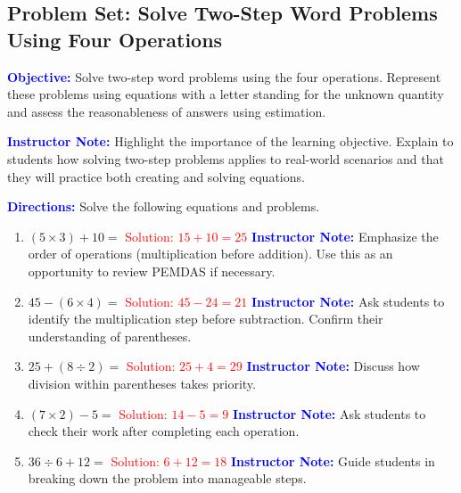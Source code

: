\documentclass[27.26.36148pt]{article}
\begin{document}
\subsection*{Problem Set: Solve Two-Step Word Problems Using Four Operations}
\onehalfspacing

\begin{tcolorbox}[colframe=black!40, colback=gray!5, 
coltitle=black, colbacktitle=black!20, fonttitle=\bfseries\Large, 
title=Learning Objective, halign title=center, left=5pt, right=5pt, top=5pt, bottom=15pt]
\textcolor{blue}{\textbf{Objective:}} Solve two-step word problems using the four operations. Represent these problems using equations with a letter standing for the unknown quantity and assess the reasonableness of answers using estimation.
\end{tcolorbox}

\textcolor{blue}{\textbf{Instructor Note:}} Highlight the importance of the learning objective. Explain to students how solving two-step problems applies to real-world scenarios and that they will practice both creating and solving equations.

\vspace{1cm}

\begin{tcolorbox}[colframe=black!60, colback=white, 
coltitle=black, colbacktitle=black!15, fonttitle=\bfseries\Large, 
title=Exercises, halign title=center, left=10pt, right=10pt, top=10pt, bottom=60pt]
\textcolor{blue}{\textbf{Directions:}} Solve the following equations and problems.

\begin{enumerate}[itemsep=1em]
    \item \( (5 \times 3) + 10 = \) \textcolor{red}{Solution: \( 15 + 10 = 25 \)}
    \textcolor{blue}{\textbf{Instructor Note:}} Emphasize the order of operations (multiplication before addition). Use this as an opportunity to review PEMDAS if necessary.

    \item \( 45 - (6 \times 4) = \) \textcolor{red}{Solution: \( 45 - 24 = 21 \)}
    \textcolor{blue}{\textbf{Instructor Note:}} Ask students to identify the multiplication step before subtraction. Confirm their understanding of parentheses.

    \item \( 25 + (8 \div 2) = \) \textcolor{red}{Solution: \( 25 + 4 = 29 \)}
    \textcolor{blue}{\textbf{Instructor Note:}} Discuss how division within parentheses takes priority.

    \item \( (7 \times 2) - 5 = \) \textcolor{red}{Solution: \( 14 - 5 = 9 \)}
    \textcolor{blue}{\textbf{Instructor Note:}} Ask students to check their work after completing each operation.

    \item \( 36 \div 6 + 12 = \) \textcolor{red}{Solution: \( 6 + 12 = 18 \)}
    \textcolor{blue}{\textbf{Instructor Note:}} Guide students in breaking down the problem into manageable steps.
\end{enumerate}
\end{tcolorbox}
\end{document}
